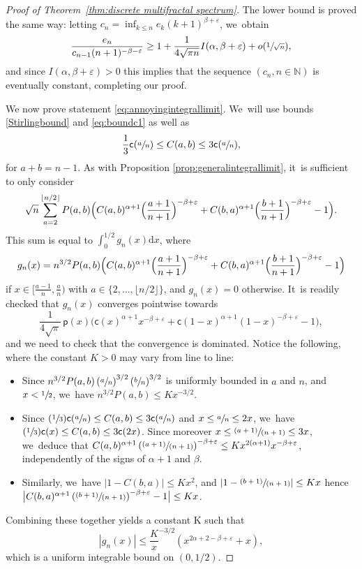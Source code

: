 \documentclass[JEP,XML,SOM,Unicode,NoFloatCountersInSection, NoEqCountersInSection,published]{cedram}
\let\epsilon\varepsilon
\newcommand{\Psfrac}[2]{(\sfrac{#1}{#2})}
\newcommand{\pspfrac}[2]{\sfrac{(#1)}{(#2)}}
\newcommand{\pp}{\mathsf{p}}
\newcommand{\cc}{\mathsf{c}}\let\ff\cc
\newcommand{\N}{\mathbb{N}}
\let\veps\varepsilon
\theoremstyle{definition}
\begin{document}
\begin{proof}[Proof of Theorem~\ref{thm:discrete multifractal spectrum}]
The lower bound is proved the same way: letting $c_n=\inf_{k\leq n}e_k (k+1)^{\beta+\veps}$, we~obtain\vspace*{-3pt}
\[
\frac{e_n}{c_{n-1}(n+1)^{-\beta-\veps}} \geq 1 + \frac1{4\sqrt{\pi n}}I(\alpha,\beta+\veps) + o(\sfrac1{\sqrt{n}}),
\]
and since $I(\alpha,\beta+\veps)>0$ this implies that the sequence $(c_n,n\in\N)$ is eventually constant, completing our proof.

We now prove statement \eqref{eq:annoyingintegrallimit}. We~will use bounds \eqref{Stirlingbound} and \eqref{eq:boundc1} as well as\vspace*{-3pt}
\[
\frac1{3} \cc{\left(\sfrac{a}{n}\right)}\leq C(a,b)\leq 3 \cc{(\sfrac{a}{n})},
\]
for $a+b=n-1$. As with Proposition \ref{prop:generalintegrallimit}, it~is sufficient to only consider\vspace*{-3pt}
\[
\sqrt{n}\sum_{a=2}^{\lfloor n/2 \rfloor}P(a,b)\Bigl(C(a,b)^{\alpha+1}\Bigl(\frac{a+1}{n+1}\Bigr)^{-\beta+\veps}+C(b,a)^{\alpha+1}\Bigl(\frac{b+1}{n+1}\Bigr)^{-\beta+\veps}-1\Bigr).
\]
This sum is equal to $\int_0^{1/2} g_n(x)\mathrm{d}x$, where\vspace*{-3pt}
\[
g_n(x)= n^{3/2}P(a,b)\Bigl(C(a,b)^{\alpha+1}\Bigl(\frac{a+1}{n+1}\Bigr)^{-\beta+\veps}+C(b,a)^{\alpha+1}\Bigl(\frac{b+1}{n+1}\Bigr)^{-\beta+\veps}-1\Bigr)
\]
if $x\in[\frac{a-1}{n},\frac{a}{n})$ with $a\in \{2,\ldots,\lfloor n/2 \rfloor\}$, and $g_n(x)=0$ otherwise. It~is readily checked that $g_n(x)$ converges pointwise towards\vspace*{-3pt}
\[
\frac{1}{4\sqrt{\pi}}\, \pp(x)\bigl(\ff(x)^{\alpha+1} x^{-\beta+\veps}+\ff(1-x)^{\alpha+1} (1-x)^{-\beta+\veps}-1\bigr),
\]
and we need to check that the convergence is dominated. Notice the following, where the constant $K>0$ may vary from line to line:
\begin{itemize}
\item Since $n^{3/2} P(a,b)\left(\sfrac{a}{n}\right)^{3/2}\left(\sfrac{b}{n}\right)^{3/2}$ is uniformly bounded in $a$ and $n$, and $x<\sfrac{1}{2}$, we~have $n^{3/2}P(a,b)\leq K x^{-3/2}$.
\item Since $\Psfrac1{3}\ff(\sfrac{a}{n})\leq C(a,b)\leq 3\ff(\sfrac{a}{n})$ and $x\leq \sfrac{a}{n}\leq 2x$, we~have $\Psfrac1{3}\ff(x)\leq C(a,b)\leq 3\ff(2x)$. Since moreover $x\leq\pspfrac{a+1}{n+1}\leq 3x$, we~deduce that $C(a,b)^{\alpha+1} \left(\pspfrac{a+1}{n+1}\right)^{-\beta+\epsilon}\leq K x^{2(\alpha+1)}x^{-\beta+\veps}$, independently of the signs of $\alpha+1$ and $\beta$.
\item Similarly, we~have $|1-C(b,a)|\leq Kx^2$, and $\left|1-\pspfrac{b+1}{n+1}\right|\leq Kx$ hence $\bigl|C(b,a)^{\alpha+1}\left(\pspfrac{b+1}{n+1}\right)^{-\beta+\epsilon}-1\bigr| \leq K x$.
\end{itemize}

Combining these together yields a constant K such that
\[
|g_n(x)|\leq \frac{K}x^{-3/2}\left(x^{2\alpha+2-\beta+\veps}+x\right),
\]
which is a uniform integrable bound on $(0,1/2)$.
\end{proof}
\end{document}

